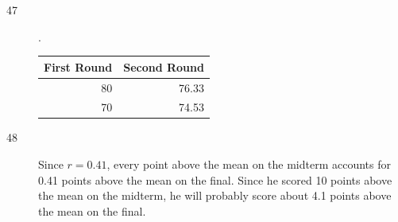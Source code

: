 \documentclass[letterpaper, landscape]{exam}
\begin{document}
\begin{description}
      \newpage

      \item[47].
        \begin{table}[H]
          \centering
          \begin{tabular}{rr}
            \toprule
            First Round & Second Round \\
            \midrule
            80          & 76.33 \\
            70          & 74.53 \\
            \bottomrule
          \end{tabular}
        \end{table}

      \item[48]
        Since $r = 0.41$, every point above the mean on the midterm accounts for
        0.41 points above the mean on the final.  Since he scored 10 points
        above the mean on the midterm, he will probably score about 4.1 points
        above the mean on the final.







\end{description}
\end{document}
